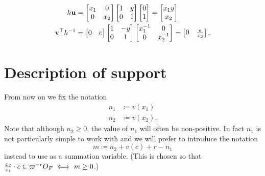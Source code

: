 \begin{align*}
  h \mathbf u &=
    \begin{bmatrix} x_1 & 0 \\ 0 & x_2 \end{bmatrix}
    \begin{bmatrix} 1 & y \\ 0 & 1 \end{bmatrix}
    \begin{bmatrix} 0 \\ 1 \end{bmatrix}
    = \begin{bmatrix} x_1 y \\ x_2 \end{bmatrix} \\
  \mathbf v^\top h^{-1} &=
    \begin{bmatrix} 0 & e \end{bmatrix}
    \begin{bmatrix} 1 & -y \\ 0 & 1 \end{bmatrix}
    \begin{bmatrix} x_1^{-1} & 0 \\ 0 & x_2^{-1} \end{bmatrix}
    = \begin{bmatrix} 0 & \frac{e}{x_2} \end{bmatrix}.
\end{align*}

\section{Description of support}
From now on we fix the notation
\begin{align*}
  n_1 &\coloneqq v(x_1) \\
  n_2 &\coloneqq v(x_2).
\end{align*}
Note that although $n_2 \ge 0$, the value of $n_1$ will often be non-positive.
In fact $n_1$ is not particularly simple to work with and we will
prefer to introduce the notation
\[ m \coloneqq n_2 + v(c) + r - n_1 \]
instead to use as a summation variable.
(This is chosen so that $\frac{x_2}{x_1} \cdot c \in \varpi^{-r} O_F \iff m \ge 0$.)

